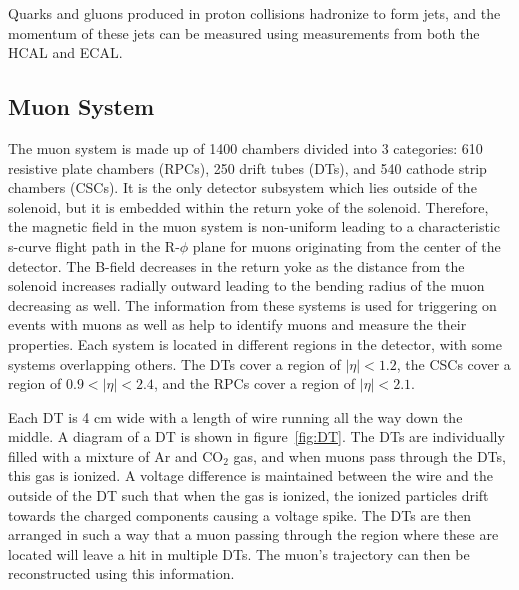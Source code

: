 Quarks and gluons produced in proton collisions hadronize to form jets,
and the momentum of these jets can be measured using measurements from both the HCAL and ECAL.

\subsection{Muon System}
\label {subs:MUON}
The muon system is made up of 1400 chambers divided into 3 categories: 610 resistive plate chambers (RPCs), 250 drift tubes (DTs), and 540 cathode strip chambers (CSCs).
It is the only detector subsystem which lies outside of the solenoid, but it is embedded within the return yoke of the solenoid.
Therefore, the magnetic field in the muon system is non-uniform leading to a characteristic s-curve
flight path in the R-$\phi$ plane for muons originating from the center of the detector.
The B-field decreases in the return yoke as the distance from the solenoid increases radially outward leading to the bending radius of the muon decreasing as well.
The information from these systems is used for triggering on events with muons as well as help to identify muons and measure the their properties.
Each system is located in different regions in the detector, with some systems overlapping others.
The DTs cover a region of $|\eta| < 1.2$, the CSCs cover a region of $0.9 < |\eta| < 2.4$, and the RPCs cover a region of $|\eta| < 2.1$.

Each DT is 4 cm wide with a length of wire running all the way down the middle.
A diagram of a DT is shown in figure~\ref{fig:DT}.
The DTs are individually filled with a mixture of Ar and $\mathrm{CO_{2}}$ gas, and when muons pass through the DTs, this gas is ionized.
A voltage difference is maintained between the wire and the outside of the DT such that when the gas is ionized,
the ionized particles drift towards the charged components causing a voltage spike.
The DTs are then arranged in such a way that a muon passing through the region where these are located will leave a hit in multiple DTs.
The muon's trajectory can then be reconstructed using this information.

